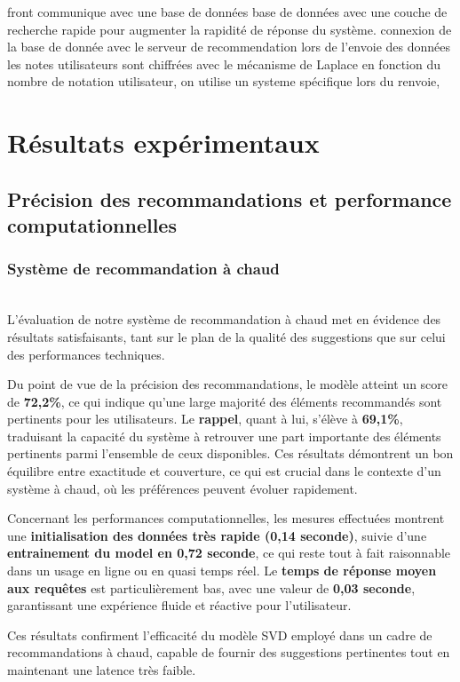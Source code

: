 \documentclass{article}
\begin{document}
front communique avec une base de données 
base de données avec une couche de recherche rapide pour augmenter la rapidité de réponse du système.
connexion de la base de donnée avec le serveur de recommendation
lors de l'envoie des données les notes utilisateurs sont chiffrées avec le mécanisme de Laplace
en fonction du nombre de notation utilisateur, on utilise un systeme spécifique
lors du renvoie, 






\section{Résultats expérimentaux}
\subsection{Précision des recommandations et performance computationnelles}
\subsubsection{Système de recommandation à chaud}
$ $\\
L’évaluation de notre système de recommandation à chaud met en évidence des résultats satisfaisants, tant sur le plan de la qualité des suggestions que sur celui des performances techniques.

Du point de vue de la précision des recommandations, le modèle atteint un score de \textbf{72,2\%}, ce qui indique qu’une large majorité des éléments recommandés sont pertinents pour les utilisateurs. Le \textbf{rappel}, quant à lui, s’élève à \textbf{69,1\%}, traduisant la capacité du système à retrouver une part importante des éléments pertinents parmi l’ensemble de ceux disponibles. Ces résultats démontrent un bon équilibre entre exactitude et couverture, ce qui est crucial dans le contexte d’un système à chaud, où les préférences peuvent évoluer rapidement.

Concernant les performances computationnelles, les mesures effectuées montrent une \textbf{initialisation des données très rapide (0,14 seconde)}, suivie d’une \textbf{entrainement du model en 0,72 seconde}, ce qui reste tout à fait raisonnable dans un usage en ligne ou en quasi temps réel. Le \textbf{temps de réponse moyen aux requêtes} est particulièrement bas, avec une valeur de \textbf{0,03 seconde}, garantissant une expérience fluide et réactive pour l’utilisateur.

Ces résultats confirment l’efficacité du modèle SVD employé dans un cadre de recommandations à chaud, capable de fournir des suggestions pertinentes tout en maintenant une latence très faible.
\end{document}

